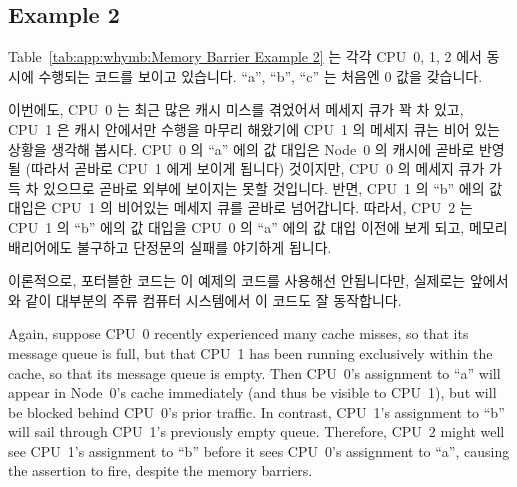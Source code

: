 \subsection{Example 2}
\label{sec:app:whymb:Example 2}

Table~\ref{tab:app:whymb:Memory Barrier Example 2} 는 각각 CPU~0, 1, 2 에서
동시에 수행되는 코드를 보이고 있습니다.
``a'', ``b'', ``c'' 는 처음엔 0 값을 갖습니다.

\begin{table}
\small
{}
\caption{Memory Barrier Example 2}
\label{tab:app:whymb:Memory Barrier Example 2}
\end{table}

이번에도, CPU~0 는 최근 많은 캐시 미스를 겪었어서 메세지 큐가 꽉 차 있고, CPU~1
은 캐시 안에서만 수행을 마무리 해왔기에 CPU~1 의 메세지 큐는 비어 있는 상황을
생각해 봅시다.
CPU~0 의 ``a'' 에의 값 대입은 Node~0 의 캐시에 곧바로 반영될 (따라서 곧바로
CPU~1 에게 보이게 됩니다) 것이지만, CPU~0 의 메세지 큐가 가득 차 있으므로
곧바로 외부에 보이지는 못할 것입니다.
반면, CPU~1 의 ``b'' 에의 값 대입은 CPU~1 의 비어있는 메세지 큐를 곧바로
넘어갑니다.
따라서, CPU~2 는 CPU~1 의 ``b'' 에의 값 대입을 CPU~0 의 ``a'' 에의 값 대입
이전에 보게 되고, 메모리 배리어에도 불구하고 단정문의 실패를 야기하게 됩니다.

이론적으로, 포터블한 코드는 이 예제의 코드를 사용해선 안됩니다만, 실제로는
앞에서와 같이 대부분의 주류 컴퓨터 시스템에서 이 코드도 잘 동작합니다.
\iffalse

Again, suppose CPU~0 recently experienced many cache misses, so that its
message queue is full, but that CPU~1 has been running exclusively within
the cache, so that its message queue is empty.
Then CPU~0's assignment to ``a'' will appear in Node~0's cache
immediately (and thus be visible to CPU~1), but will be blocked behind
CPU~0's prior traffic.
In contrast, CPU~1's assignment to ``b'' will sail through CPU~1's
previously empty queue.
Therefore, CPU~2 might well see CPU~1's assignment to ``b'' before
it sees CPU~0's assignment to ``a'', causing the assertion to fire,
despite the memory barriers.

